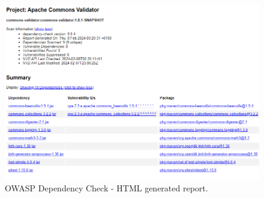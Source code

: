 \documentclass{sigchi}
\begin{document}
\begin{figure}[h!]
    \centering
    \includegraphics[width=1\columnwidth]{owaspReport2.png}
    \caption{OWASP Dependency Check - HTML generated report.}
    \label{fig:enter-label}
\end{figure}
\end{document}
